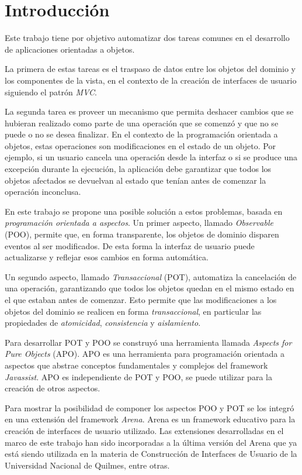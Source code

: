 \section{Introducción}

Este trabajo tiene por objetivo automatizar dos tareas comunes en el
desarrollo de aplicaciones orientadas a objetos.

La primera de estas tareas es el traspaso de datos entre los objetos del dominio
y los componentes de la vista, en el contexto de la creación de interfaces de
usuario siguiendo el patrón \emph{MVC}.
 
La segunda tarea es proveer un mecanismo que permita deshacer cambios que se
hubieran realizado como parte de una operación que se comenzó y que no se puede
o no se desea finalizar.
En el contexto de la programación orientada a objetos, estas operaciones son
modificaciones en el estado de un objeto.
Por ejemplo, si un usuario cancela una operación desde
la interfaz o si se produce una excepción durante la ejecución, la aplicación
debe garantizar que todos los objetos afectados se devuelvan al estado que
tenían antes de comenzar la operación inconclusa.

\medskip 

En este trabajo se propone una posible solución a estos problemas, basada en
\emph{programación orientada a aspectos}.
Un primer aspecto, llamado \emph{Observable} (POO), permite que, en forma
transparente, los objetos de dominio disparen eventos al ser modificados.
De esta forma la interfaz de usuario puede actualizarse y reflejar esos
cambios en forma automática.

Un segundo aspecto, llamado \emph{Transaccional} (POT), automatiza la
cancelación de una operación, garantizando que todos los objetos quedan en el
mismo estado en el que estaban antes de comenzar. 
Esto permite que las modificaciones a los objetos del dominio se realicen
en forma \emph{transaccional}, en particular las propiedades de
\emph{atomicidad}, \emph{consistencia} y \emph{aislamiento}.

Para desarrollar POT y POO se construyó una herramienta llamada
\emph{Aspects for Pure Objects} (APO).
APO es una herramienta para programación orientada a aspectos que abstrae
conceptos fundamentales y complejos del framework \emph{Javassist}. 
APO es independiente de POT y POO, se puede utilizar
para la creación de otros aspectos.

Para mostrar la posibilidad de componer los aspectos POO y POT se los integró en
una extensión del framework \emph{Arena}.
Arena es un framework educativo para la creación de interfaces de usuario
utilizado.
Las extensiones desarrolladas en el marco de este trabajo han sido incorporadas
a la última versión del Arena que ya está siendo utilizada en la materia de
Construcción de Interfaces de Usuario de la Universidad Nacional de Quilmes,
entre otras.

